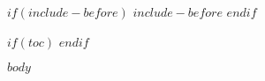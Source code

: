 \documentclass[oneside,a4paper,final,14pt]{$reporttype$}
\begin{document}
$if(include-before)$
    $include-before$
$endif$

$if(toc)$
    \tableofcontents
    \clearpage
$endif$

$body$
\end{document}
